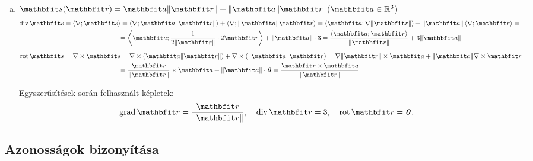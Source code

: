 \documentclass{szb-solution}
\begin{document}
\begin{enumerate}[a)]
  \item $\rvec s(\coordvec) = \rvec a \| \coordvec \| + \| \rvec a \| \coordvec$
        \hfill ($\rvec a \in \Reals^3$)
        \begin{align*}
          \Div \rvec s
           & = \scalar{\nabla}{\rvec s}
          = \scalar{\nabla}{\rvec a \| \coordvec \|} + \scalar{\nabla}{\| \rvec a \| \coordvec}
          = \scalar{\rvec a}{\nabla \| \coordvec \|} + \| \rvec a \| \scalar{\nabla}{\coordvec}
          =
          \\
           & \phantom{= \scalar{\nabla}{\rvec s}}
          = \scalar{\rvec a}{\frac{1}{2 \|\coordvec\|} \cdot 2 \coordvec} + \| \rvec a \| \cdot 3
          = \frac{\scalar{\rvec a}{\coordvec}}{\|\coordvec\|} + 3 \| \rvec a \|
          \\[2mm]
          \rot \rvec s
           & = \nabla \times \rvec s
          = \nabla \times (\rvec a \| \coordvec \|) + \nabla \times (\| \rvec a \| \coordvec)
          = \nabla \| \coordvec \| \times \rvec a + \| \rvec a \| \nabla \times \coordvec
          =
          \\
           & \phantom{= \nabla \times \rvec s}
          = \frac{\coordvec}{\|\coordvec\|} \times \rvec a + \| \rvec a \| \cdot \nvec
          = \frac{\coordvec \times \rvec a}{\|\coordvec\|}
        \end{align*}

        Egyszerűsítések során felhasznált képletek:
        $$
          \grad \coordvec = \frac{\coordvec}{\|\coordvec\|}, \quad
          \Div \coordvec = 3, \quad
          \rot \coordvec = \nvec
          \text.
        $$
\end{enumerate}

\clearpage
\subsection{Azonosságok bizonyítása}
\end{document}
